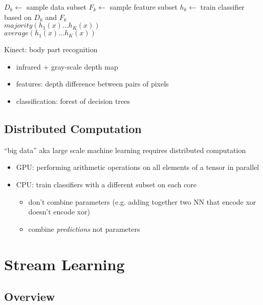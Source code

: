 \documentclass[]{article}
\theoremstyle{definition}
\begin{document}
\begin{algorithmic}
    \State $D_k \gets$ sample data subset
    \State $F_k \gets$ sample feature subset
    \State $h_k \gets$ train classifier based on $D_k$ and $F_k$
    \EndFor
     \\
    \Return $majority(h_1(x) \ldots h_K(x))$
     \\
    \Return $average(h_1(x) \ldots h_K(x))$
    \EndIf
\end{algorithmic}

Kinect: body part recognition
\begin{itemize}
    \item infrared + gray-scale depth map
    \item features: depth difference between pairs of pixels
    \item classification: forest of decision trees
\end{itemize}

\subsection{Distributed Computation}
\label{sub:distributed_computation}
``big data'' aka large scale machine learning requires distributed computation
\begin{itemize}
    \item GPU: performing arithmetic operations on all elements of a tensor in parallel
    \item CPU: train classifiers with a different subset on each core
        \begin{itemize}
            \item don't combine parameters (e.g. adding together two NN that encode xor doesn't encode xor)
            \item combine \textit{predictions} not parameters
        \end{itemize}
\end{itemize}

\section{Stream Learning}
\label{sec:stream_learning}

\subsection{Overview}
\label{sub:stream_learning_overview}
\end{document}
